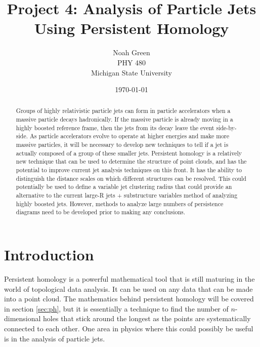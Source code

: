 \documentclass[a4paper,12pt]{report}
\begin{document}
\title{Project 4: Analysis of Particle Jets Using Persistent Homology}
\author{Noah Green \\ PHY 480 \\ Michigan State University}
\date{ \today}
\maketitle
\begin{abstract}
 Groups of highly relativistic particle jets can form in particle accelerators when a massive particle decays hadronically. If the massive particle is already moving in a highly boosted reference frame, then the jets from its decay leave the event side-by-side. As particle accelerators evolve to operate at higher energies and make more massive particles, it will be necessary to develop new techniques to tell if a jet is actually composed of a group of these smaller jets. Persistent homology is a relatively new technique that can be used to determine the structure of point clouds, and has the potential to improve current jet analysis techniques on this front. It has the ability to distinguish the distance scales on which different structures can be resolved. This could potentially be used to define a variable jet clustering radius that could provide an alternative to the current large-R jets + substructure variables method of analyzing highly boosted jets. However, methods to analyze large numbers of persistence diagrams need to be developed prior to making any conclusions.
\end{abstract}

\doublespacing
\section{Introduction}\label{sec:intro}
Persistent homology is a powerful mathematical tool that is still maturing in the world of topological data analysis. It can be used on any data that can be made into a point cloud. The mathematics behind persistent homology will be covered in section \ref{sec:ph}, but it is essentially a technique to find the number of $n$-dimensional holes that stick around the longest as the points are systematically connected to each other. One area in physics where this could possibly be useful is in the analysis of particle jets. 

\end{document}

